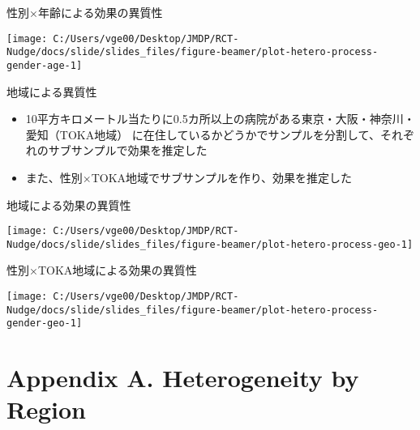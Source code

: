 \documentclass[
      aspectratio=169,
        12pt,
    ]{beamer}
\providecommand{\tightlist}{%
  \setlength{\itemsep}{0pt}\setlength{\parskip}{0pt}}
\begin{document}
\begin{frame}{性別×年齢による効果の異質性}
\protect\hypertarget{ux6027ux5225ux5e74ux9f62ux306bux3088ux308bux52b9ux679cux306eux7570ux8ceaux6027-2}{}
\begin{center}\texttt{[image: C:/Users/vge00/Desktop/JMDP/RCT-Nudge/docs/slide/slides\_files/figure-beamer/plot-hetero-process-gender-age-1]} \end{center}
\end{frame}

\begin{frame}{地域による異質性}
\protect\hypertarget{ux5730ux57dfux306bux3088ux308bux7570ux8ceaux6027}{}
\begin{itemize}
\tightlist
\item
  10平方キロメートル当たりに0.5カ所以上の病院がある東京・大阪・神奈川・愛知（TOKA地域）
  に在住しているかどうかでサンプルを分割して、それぞれのサブサンプルで効果を推定した
\item
  また、性別×TOKA地域でサブサンプルを作り、効果を推定した
\end{itemize}
\end{frame}

\begin{frame}{地域による効果の異質性}
\protect\hypertarget{ux5730ux57dfux306bux3088ux308bux52b9ux679cux306eux7570ux8ceaux6027}{}
\begin{center}\texttt{[image: C:/Users/vge00/Desktop/JMDP/RCT-Nudge/docs/slide/slides\_files/figure-beamer/plot-hetero-process-geo-1]} \end{center}
\end{frame}

\begin{frame}{性別×TOKA地域による効果の異質性}
\protect\hypertarget{ux6027ux5225tokaux5730ux57dfux306bux3088ux308bux52b9ux679cux306eux7570ux8ceaux6027}{}
\begin{center}\texttt{[image: C:/Users/vge00/Desktop/JMDP/RCT-Nudge/docs/slide/slides\_files/figure-beamer/plot-hetero-process-gender-geo-1]} \end{center}
\end{frame}

\hypertarget{appendix-a.-heterogeneity-by-region}{%
\section{Appendix A. Heterogeneity by Region}\label{appendix-a.-heterogeneity-by-region}}
\end{document}
